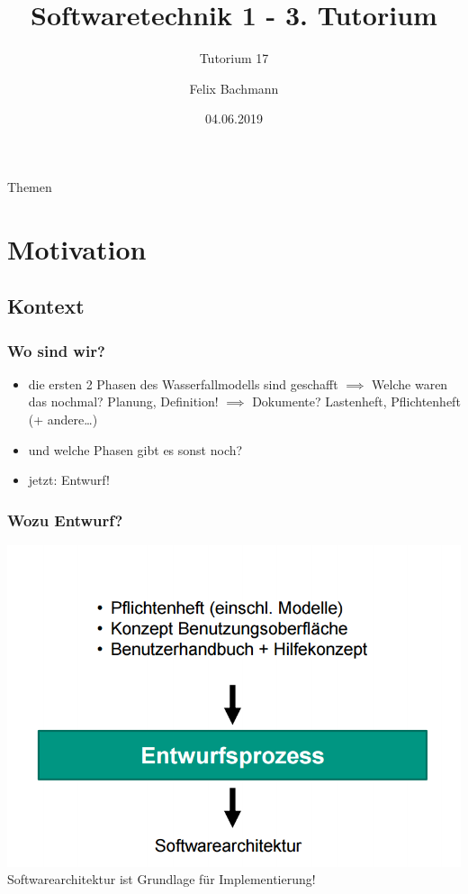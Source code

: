 \documentclass[18pt]{beamer}
\title[SWT1]{Softwaretechnik 1 - 3. Tutorium}
\subtitle{Tutorium 17}
\author{Felix Bachmann}
\date{04.06.2019}
\institute{KIT - Institut für Programmstrukturen und Datenorganisation (IPD)}
\begin{document}

\begin{frame}
\titlepage
\end{frame}

\begin{frame}{Themen}
\tableofcontents
\end{frame}

\section{Motivation}
	\subsection{Kontext}
		\begin{frame}
			\frametitle{Wo sind wir?}
			\begin{itemize}
				\item die ersten 2 Phasen des Wasserfallmodells sind geschafft
				\pause
				\linebreak $\implies$ Welche waren das nochmal? \pause Planung, Definition!
				\pause
				\linebreak $\implies$ Dokumente? \pause Lastenheft, Pflichtenheft (+ andere\dots)
				\pause
				\item und welche Phasen gibt es sonst noch? \pause
				\item  jetzt: Entwurf!
			\end{itemize}
		\end{frame}
	
		\begin{frame}
			\frametitle{Wozu Entwurf?}
			\centering
			\includegraphics[scale=0.4]{./pics/tut3/design.png} \linebreak
			Softwarearchitektur ist Grundlage für Implementierung!
		\end{frame}
	
\end{document}
